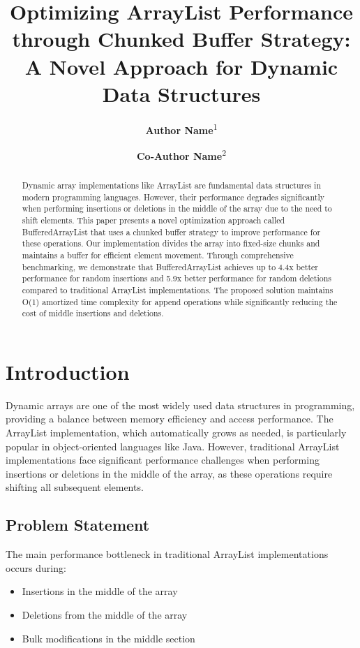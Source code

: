 \documentclass[twocolumn]{article}
\title{Optimizing ArrayList Performance through Chunked Buffer Strategy: A Novel Approach for Dynamic Data Structures}
\author{
    \textbf{Author Name}\textsuperscript{1} \and
    \textbf{Co-Author Name}\textsuperscript{2}
}
\date{}
\begin{document}
\maketitle

\begin{abstract}
Dynamic array implementations like ArrayList are fundamental data structures in modern programming languages. However, their performance degrades significantly when performing insertions or deletions in the middle of the array due to the need to shift elements. This paper presents a novel optimization approach called BufferedArrayList that uses a chunked buffer strategy to improve performance for these operations. Our implementation divides the array into fixed-size chunks and maintains a buffer for efficient element movement. Through comprehensive benchmarking, we demonstrate that BufferedArrayList achieves up to 4.4x better performance for random insertions and 5.9x better performance for random deletions compared to traditional ArrayList implementations. The proposed solution maintains O(1) amortized time complexity for append operations while significantly reducing the cost of middle insertions and deletions.
\end{abstract}

\section{Introduction}
Dynamic arrays are one of the most widely used data structures in programming, providing a balance between memory efficiency and access performance. The ArrayList implementation, which automatically grows as needed, is particularly popular in object-oriented languages like Java. However, traditional ArrayList implementations face significant performance challenges when performing insertions or deletions in the middle of the array, as these operations require shifting all subsequent elements.

\subsection{Problem Statement}
The main performance bottleneck in traditional ArrayList implementations occurs during:
\begin{itemize}
    \item Insertions in the middle of the array
    \item Deletions from the middle of the array
    \item Bulk modifications in the middle section
\end{itemize}
\end{document}
